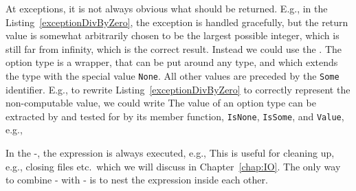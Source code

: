At exceptions, it is not always obvious what should be returned. E.g., in the Listing~\ref{exceptionDivByZero}, the exception is handled gracefully, but the return value is somewhat arbitrarily chosen to be the largest possible integer, which is still far from infinity, which is the correct result. Instead we could use the . The option type is a wrapper, that can be put around any type, and which extends the type with the special value \lstinline!None!. All other values are preceded by the \lstinline!Some! identifier. E.g., to rewrite Listing~\ref{exceptionDivByZero} to correctly represent the non-computable value, we could write
%
%
The value of an option type can be extracted by and tested for by its member function, \lstinline!IsNone!, \lstinline!IsSome!, and \lstinline!Value!, e.g.,
%
%

In the -, the  expression is always executed, e.g.,
%
%
This is useful for cleaning up, e.g., closing files etc.\ which we will discuss in Chapter~\ref{chap:IO}. The only way to combine - with - is to nest the expression inside each other.

\begin{comment}
\begin{itemize}
\item exn type Spec-4.0 Chapter 18.1
\item Spec-4.0 Section 18.2.8
\end{itemize}
\end{comment}



